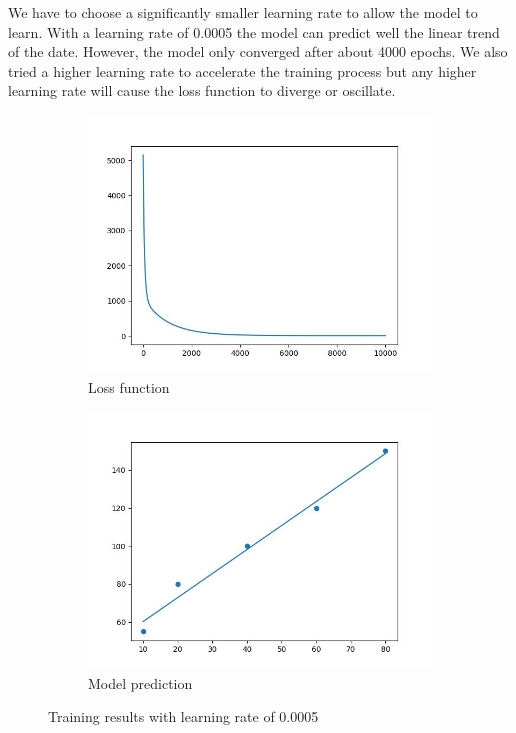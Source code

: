 \documentclass{article}
\begin{document}
We have to choose a significantly smaller learning rate to allow the model to learn. With a learning rate of 0.0005 the model can predict well the linear trend of the date. However, the model only converged after about 4000 epochs.
We also tried a higher learning rate to accelerate the training process but any higher learning rate will cause the loss function to diverge or oscillate.

\begin{figure}[H]
    \begin{subfigure}{0.5\linewidth}
    \centering
        \includegraphics[width=\linewidth]{loss_train_no_norm_0.0005lr.jpg}
        \caption{Loss function}
    \end{subfigure}
    \begin{subfigure}{0.5\linewidth}
    \centering
        \includegraphics[width=\linewidth]{output_train_no_norm_0.0005lr.jpg}
        \caption{Model prediction}
    \end{subfigure}
    \caption{Training results with learning rate of 0.0005}
    \label{fig:enter-label}
\end{figure}
\end{document}

